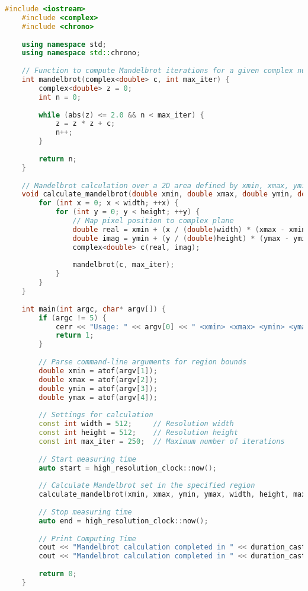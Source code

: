 \begin{lstlisting}[language=C++, frame=tb, caption={Mandelbrot Set Calculation}]
    #include <iostream>
    #include <complex>
    #include <chrono>
    
    using namespace std;
    using namespace std::chrono;
    
    // Function to compute Mandelbrot iterations for a given complex number
    int mandelbrot(complex<double> c, int max_iter) {
        complex<double> z = 0;
        int n = 0;
    
        while (abs(z) <= 2.0 && n < max_iter) {
            z = z * z + c;
            n++;
        }
    
        return n;
    }
    
    // Mandelbrot calculation over a 2D area defined by xmin, xmax, ymin, ymax
    void calculate_mandelbrot(double xmin, double xmax, double ymin, double ymax, int width, int height, int max_iter) {
        for (int x = 0; x < width; ++x) {
            for (int y = 0; y < height; ++y) {
                // Map pixel position to complex plane
                double real = xmin + (x / (double)width) * (xmax - xmin);
                double imag = ymin + (y / (double)height) * (ymax - ymin);
                complex<double> c(real, imag);
    
                mandelbrot(c, max_iter);
            }
        }
    }
    
    int main(int argc, char* argv[]) {
        if (argc != 5) {
            cerr << "Usage: " << argv[0] << " <xmin> <xmax> <ymin> <ymax>" << endl;
            return 1;
        }
    
        // Parse command-line arguments for region bounds
        double xmin = atof(argv[1]);
        double xmax = atof(argv[2]);
        double ymin = atof(argv[3]);
        double ymax = atof(argv[4]);
    
        // Settings for calculation
        const int width = 512;     // Resolution width
        const int height = 512;    // Resolution height
        const int max_iter = 250;  // Maximum number of iterations
    
        // Start measuring time
        auto start = high_resolution_clock::now();
    
        // Calculate Mandelbrot set in the specified region
        calculate_mandelbrot(xmin, xmax, ymin, ymax, width, height, max_iter);
    
        // Stop measuring time
        auto end = high_resolution_clock::now();
    
        // Print Computing Time
        cout << "Mandelbrot calculation completed in " << duration_cast<milliseconds>(end - start).count() << "[ms]" << endl;
        cout << "Mandelbrot calculation completed in " << duration_cast<seconds>(end - start).count() << "[s]" << endl;
    
        return 0;
    }
\end{lstlisting}

